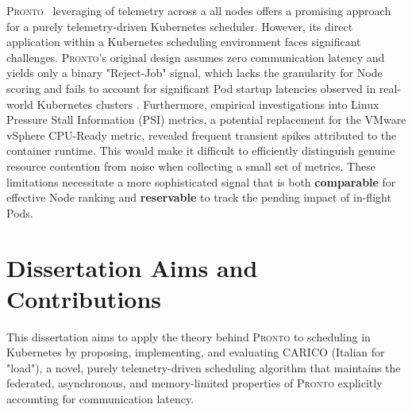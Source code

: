 \textsc{Pronto}~\cite{grammenos_pronto_2021} leveraging of telemetry across a
all nodes offers a promising approach for a purely telemetry-driven Kubernetes
scheduler. However, its direct application within a Kubernetes scheduling
environment faces significant challenges. \textsc{Pronto}'s original design
assumes zero communication latency and yields only a binary "Reject-Job" signal,
which lacks the granularity for Node scoring and fails to account
for significant Pod startup latencies observed in real-world Kubernetes clusters
\cite{qadeer_scaling_2022}. Furthermore, empirical investigations into Linux
Pressure Stall Information (PSI) metrics, a potential replacement for the VMware
vSphere CPU-Ready metric, revealed frequent transient spikes attributed to the
container runtime. This would make it difficult to efficiently distinguish
genuine resource contention from noise when collecting a small set of metrics.
These limitations necessitate a more sophisticated signal that is both
\textbf{comparable} for effective Node ranking and \textbf{reservable} to track
the pending impact of in-flight Pods.

\section{Dissertation Aims and Contributions}

This dissertation aims to apply the theory behind \textsc{Pronto} to scheduling
in Kubernetes by proposing, implementing, and evaluating \textsc{CARICO} (Italian
for "load"), a novel, purely telemetry-driven scheduling algorithm that
maintains the federated, asynchronous, and memory-limited properties of
\textsc{Pronto} explicitly accounting for communication latency.

